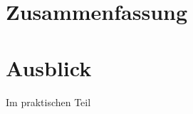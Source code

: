 \documentclass[11pt,a4paper]{report} %
\begin{document}





\chapter{Zusammenfassung}
\label{ch:zusammenfassung}

%
%
%

%

%



\chapter{Ausblick}
\label{ch:ausblick}
Im praktischen Teil

\printbibliography%
\listoffigures
\listoftables
\lstlistoflistings
\appendix


\end{document}
